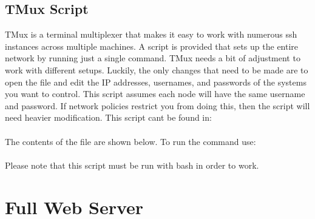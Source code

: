 

\subsection{TMux Script}

TMux is a terminal multiplexer that makes it easy to work with numerous ssh instances across multiple machines. A script is provided that sets up the entire network by running just a single command. TMux needs a bit of adjustment to work with different setups. Luckily, the only changes that need to be made are to open the file and edit the IP addresses, usernames, and passwords of the systems you want to control. This script assumes each node will have the same username and password. If network policies restrict you from doing this, then the script will need heavier modification. This script cant be found in: \\

 \\

The contents of the file are shown below. To run the command use: \\

 \\

Please note that this script must be run with bash in order to work. 






\section{Full Web Server}


